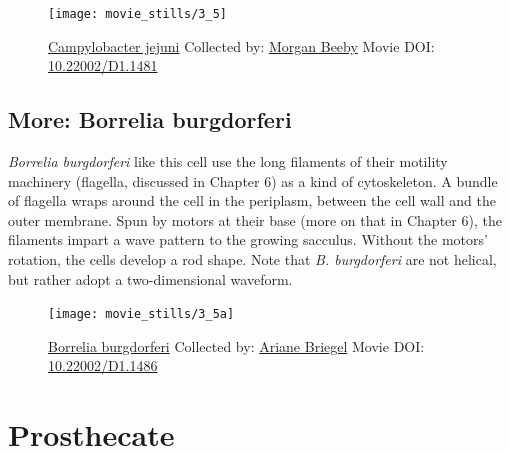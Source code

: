 \documentclass[]{tufte-book}
\begin{document}
\begin{figure}
\texttt{[image: movie\_stills/3\_5]} \caption[\protect\hyperlink{tree}{Campylobacter jejuni} Collected by:
\protect\hyperlink{morgan_beeby}{Morgan Beeby} Movie DOI:
\href{https://doi.org/10.22002/D1.1481}{10.22002/D1.1481}]{\protect\hyperlink{tree}{Campylobacter jejuni} Collected by:
\protect\hyperlink{morgan_beeby}{Morgan Beeby} Movie DOI:
\href{https://doi.org/10.22002/D1.1481}{10.22002/D1.1481}}\label{fig:3-5}
\end{figure}

\hypertarget{Borrelia_burgdorferi}{\subsection*{More: Borrelia
burgdorferi}\label{Borrelia_burgdorferi}}

\emph{Borrelia burgdorferi} like this cell use the long filaments of
their motility machinery (flagella, discussed in Chapter 6) as a kind of
cytoskeleton. A bundle of flagella wraps around the cell in the
periplasm, between the cell wall and the outer membrane. Spun by motors
at their base (more on that in Chapter 6), the filaments impart a wave
pattern to the growing sacculus. Without the motors' rotation, the cells
develop a rod shape. Note that \emph{B. burgdorferi} are not helical,
but rather adopt a two-dimensional waveform.





\begin{figure}
\texttt{[image: movie\_stills/3\_5a]} \caption[\protect\hyperlink{tree}{Borrelia burgdorferi} Collected by:
\protect\hyperlink{ariane_briegel}{Ariane Briegel} Movie DOI:
\href{https://doi.org/10.22002/D1.1486}{10.22002/D1.1486}]{\protect\hyperlink{tree}{Borrelia burgdorferi} Collected by:
\protect\hyperlink{ariane_briegel}{Ariane Briegel} Movie DOI:
\href{https://doi.org/10.22002/D1.1486}{10.22002/D1.1486}}\label{fig:3-5a}
\end{figure}

\section{Prosthecate}\label{prosthecate}
\end{document}
